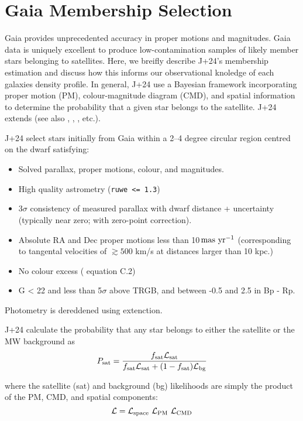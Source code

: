 \section{Gaia Membership Selection}\label{gaia-membership-selection}

Gaia provides unprecedented accuracy in proper motions and magnitudes.
Gaia data is uniquely excellent to produce low-contamination samples of
likely member stars belonging to satellites. Here, we breifly describe
J+24's membership estimation and discuss how this informs our
observational knoledge of each galaxies density profile. In general,
J+24 use a Bayesian framework incorporating proper motion (PM),
colour-magnitude diagram (CMD), and spatial information to determine the
probability that a given star belongs to the satellite. J+24 extends
\citet{MV2020a} (see also \citet{pace+li2019}, \citet{battaglia+2022},
\citet{pace+erkal+li2022}, etc.).

J+24 select stars initially from Gaia within a 2--4 degree circular
region centred on the dwarf satisfying:

\begin{itemize}
\tightlist
\item
  Solved parallax, proper motions, colour, and magnitudes.
\item
  High quality astrometry (\texttt{ruwe\ \textless{}=\ 1.3})
\item
  3\(\sigma\) consistency of measured parallax with dwarf distance +
  uncertainty (typically near zero; with \citet{lindegren+2018}
  zero-point correction).
\item
  Absolute RA and Dec proper motions less than
  10\(\,{\rm mas\ yr^{-1}}\) (corresponding to tangental velocities of
  \(\gtrsim 500\) km/s at distances larger than 10 kpc.)
\item
  No colour excess (\citet{lindegren+2018} equation C.2)
\item
  G \textless{} 22 and less than 5\(\sigma\) above TRGB, and between
  -0.5 and 2.5 in Bp - Rp.
\end{itemize}

Photometry is dereddened using \citet{schlegel+1988} extenction.

J+24 calculate the probability that any star belongs to either the
satellite or the MW background as \[
P_{\rm sat} = \frac{f_{\rm sat}{\cal L}_{\rm sat}}{f_{\rm sat}{\cal L}_{\rm sat} + (1-f_{\rm sat}){\cal L}_{\rm bg}}
\]

where the satellite (sat) and background (bg) likelihoods are simply the
product of the PM, CMD, and spatial components: \[
{\cal L} = {\cal L}_{\rm space}\ {\cal L}_{\rm PM}\ {\cal L}_{\rm CMD}
\]

